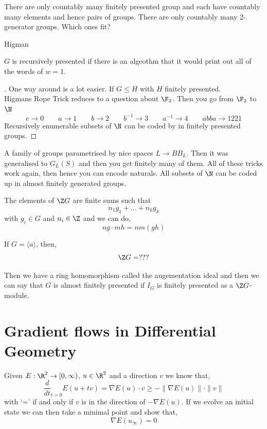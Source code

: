 \documentclass{article}
\begin{document}
There are only countably many finitely presented group and each have countably many elements and hence pairs of groups. There are only countably many 2-generator groups. Which ones fit?

\begin{nthm}[]
  Higman
\end{nthm}

$G$ is recursively presented if there is an algeothm that it would print out all of the words of $w = 1$.

\begin{proof}[]
  One way around is a lot easier. If $G \le H$ with $H$ finitely presented.\\
  Higmans Rope Trick reduces to a question about $\F_2$. Then you go from $\F_2$ to $\N$
  $$ e \to 0 \qquad a \to 1 \qquad b \to 2 \qquad b^{-1} \to 3 \qquad a^{-1} \to 4 \qquad abba \to 1221 $$
  Recursively enumerable subsets of $\N$ can be coded by in finitely presented groups.
\end{proof}


A family of groups parametrised by nice spaces $L \to BB_L$. Then it was generalised to $G_L(S)$ and then you get finitely many of them. All of these tricks work again, then hence you can encode naturals. All subsets of $\N$ can be coded up in almost finitely generated groups.

The elements of $\Z G$ are finite sums such that
$$ n_1g_1 + \dots + n_kg_k $$
with $g_i \in G$ and $n_i \in \Z$ and we can do,
$$ ng \cdot mh = nm(gh) $$
\begin{eg}
  If $G = \langle a \rangle$, then,
  $$ \Z G = ???$$
\end{eg}

Then we have a ring homomorphism called the augementation ideal and then we can say that $G$ is almost finitely presented if $I_G$ is finitely presented as a $\Z G$-module.

\section{Gradient flows in Differential Geometry}

Given $E : \R^2 \to [0, \infty)$, $u \in \R^2$ and a direction $v$ we know that,
$$ \frac{d}{dt}_{t=0} E(u + tv) = \nabla E(u) \cdot v \ge  -\|\nabla E(u) \|\cdot \|v\| $$
with `=' if and only if $v$ is in the direction of $-\nabla E(u)$. If we evolve an initial state we can then take a minimal point and show that,
$$ \nabla E(u_\infty) = 0 $$
\end{document}
